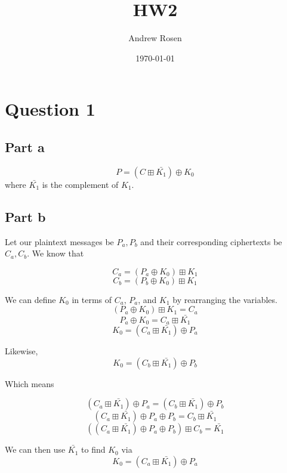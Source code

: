 \documentclass[a4paper,10pt]{article}
\title{HW2}
\author{Andrew Rosen}
\date{\today}
\begin{document}
\section{Question 1}

\subsection{Part a}
$$P = (C \boxplus \bar{K_{1}}) \oplus K_{0}$$ where $\bar{K_{1}}$ is the complement of $K_{1}$. 
\subsection{Part b}
Let our plaintext messages be $P_{a}, P_{b} $ and their corresponding ciphertexts be $C_{a}, C_{b}$.  We know that

$$ C_{a} = (P_{a} \oplus K_{0}) \boxplus K_{1} $$
$$ C_{b} = (P_{b} \oplus K_{0}) \boxplus K_{1} $$

We can define $K_{0}$ in terms of $C_{a}$, $P_{a}$, and $K_{1}$ by rearranging the variables.   
$$ (P_{a} \oplus K_{0}) \boxplus K_{1}  = C_{a} $$
$$  P_{a} \oplus K_{0} = C_{a} \boxplus \bar{K_{1}} $$
$$  K_{0} = (C_{a} \boxplus \bar{K_{1}}) \oplus P_{a} $$

Likewise,
$$  K_{0} = (C_{b} \boxplus \bar{K_{1}}) \oplus P_{b} $$

Which means

$$(C_{a} \boxplus \bar{K_{1}}) \oplus P_{a} = (C_{b} \boxplus \bar{K_{1}}) \oplus P_{b} $$
$$(C_{a} \boxplus \bar{K_{1}}) \oplus P_{a} \oplus P_{b} = C_{b} \boxplus \bar{K_{1}}$$
$$\left(\left(C_{a} \boxplus \bar{K_{1}}\right) \oplus P_{a} \oplus P_{b}\right) \boxplus C_{b} =  \bar{K_{1}}$$

We can then use  $\bar{K_{1}}$ to find $K_{0}$ via
$$  K_{0} = (C_{a} \boxplus \bar{K_{1}}) \oplus P_{a} $$
\end{document}

